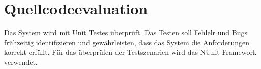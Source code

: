 \section{Quellcodeevaluation}

Das System wird mit Unit Testes überprüft. Das Testen soll Fehlelr und Bugs frühzeitig identifizieren und gewährleisten, dass das System die Anforderungen korrekt erfüllt. Für das überprüfen der Testszenarien wird das NUnit Framework verwendet.
